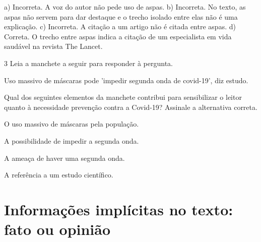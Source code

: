 {{a) Incorreta. A voz do autor não pede uso de aspas. 
b) Incorreta. No texto, as aspas não servem para dar destaque e o trecho isolado entre 
elas não é uma explicação.
c) Incorreta. A citação a um artigo não é citada entre aspas.
d) Correta. O trecho entre aspas indica a citação de um especialista em 
vida saudável na revista The Lancet.}

\num{3} Leia a manchete a seguir para responder à pergunta. 

Uso massivo de máscaras pode 'impedir segunda onda de covid-19', diz
estudo.


Qual dos seguintes elementos da manchete contribui para sensibilizar o leitor 
quanto à necessidade prevenção contra a Covid-19? Assinale a alternativa correta.

\begin{escolha}

  \item O uso massivo de máscaras pela população.

  \item A possibilidade de impedir a segunda onda.

  \item A ameaça de haver uma segunda onda.

  \item A referência a um estudo científico.

\end{escolha}


\chapter{Informações implícitas no texto: fato ou opinião}

}
